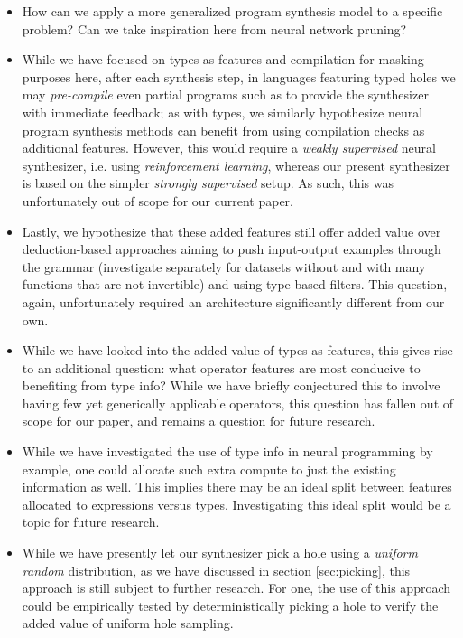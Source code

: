 \documentclass{article}
\begin{document}
\begin{itemize}
    \item How can we apply a more generalized program synthesis model to a specific problem?
    Can we take inspiration here from neural network pruning?
    \item While we have focused on types as features and compilation for masking purposes here,
    after each synthesis step,
    in languages featuring typed holes we may \emph{pre-compile} even partial programs such as to provide the synthesizer with immediate feedback;
    as with types, we similarly hypothesize neural program synthesis methods can benefit from using compilation checks as additional features.
    However, this would require a \emph{weakly supervised} neural synthesizer,
    i.e. using \emph{reinforcement learning},
    whereas our present synthesizer is based on the simpler \emph{strongly supervised} setup.
    As such, this was unfortunately out of scope for our current paper.
    \item Lastly, we hypothesize that these added features still offer added value over
    deduction-based approaches aiming to push input-output examples through the grammar
    (investigate separately for datasets without and with many functions that are not invertible)
    and using type-based filters.
    This question, again, unfortunately required an architecture significantly different from our own.
    \item While we have looked into the added value of types as features,
    this gives rise to an additional question:
    what operator features are most conducive to benefiting from type info?
    While we have briefly conjectured this to involve having few yet generically applicable operators,
    this question has fallen out of scope for our paper,
    and remains a question for future research.
    \item While we have investigated the use of type info in neural programming by example,
    one could allocate such extra compute to just the existing information as well.
    This implies there may be an ideal split between features allocated to expressions versus types.
    Investigating this ideal split would be a topic for future research.
    \item While we have presently let our synthesizer pick a hole using a \emph{uniform random} distribution,
    as we have discussed in section \ref{sec:picking},
    this approach is still subject to further research.
    For one, the use of this approach could be empirically tested by deterministically picking a hole to verify the added value of uniform hole sampling.

\end{itemize}
\end{document}

